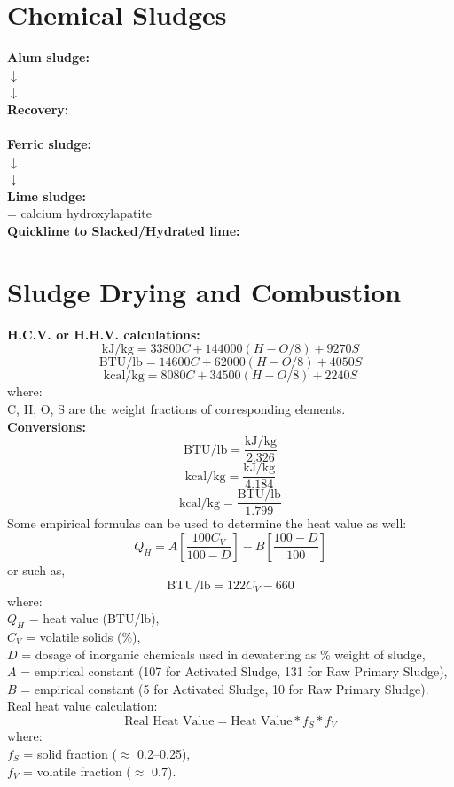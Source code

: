 \documentclass[a4paper, landscape, 8pt]{extarticle}
\begin{document}
\begin{multicols}{4}
\section*{Chemical Sludges}
\textbf{Alum sludge:}\\
 $\downarrow$\\
 $\downarrow$\\
\textbf{Recovery:}\\
\\
\textbf{Ferric sludge:}\\
 $\downarrow$\\
 $\downarrow$\\
\textbf{Lime sludge:}\\
 = calcium hydroxylapatite\\
\textbf{Quicklime to Slacked/Hydrated lime:}\\
\section*{Sludge Drying and Combustion} \label{Sludge_D_C}
\textbf{H.C.V. or H.H.V. calculations:}
\[
\text{kJ/kg} = 33800 C + 144000 (H - O/8) + 9270 S
\]
\[
\text{BTU/lb} = 14600 C + 62000 (H - O/8) + 4050 S
\]
\[
\text{kcal/kg} = 8080 C + 34500 (H - O/8) + 2240 S
\]
where:\\
C, H, O, S are the weight fractions of corresponding elements.\\
\textbf{Conversions:}
\[
\text{BTU/lb} = \frac{\text{kJ/kg}}{2.326}
\]
\[
\text{kcal/kg} = \frac{\text{kJ/kg}}{4.184}
\]
\[
\text{kcal/kg} = \frac{\text{BTU/lb}}{1.799}
\]
Some empirical formulas can be used to determine the heat value as well:
\[
Q_H = A\left[\frac{100C_V}{100-D}\right] - B\left[\frac{100-D}{100}\right]
\]
or such as,
\[
\text{BTU/lb} = 122C_V - 660
\]
where:\\
$Q_H$ = heat value (BTU/lb),\\
$C_V$ = volatile solids (\%),\\
$D$ = dosage of inorganic chemicals used in dewatering as \% weight of sludge,\\
$A$ = empirical constant (107 for Activated Sludge, 131 for Raw Primary Sludge),\\
$B$ = empirical constant (5 for Activated Sludge, 10 for Raw Primary Sludge).\\
Real heat value calculation:
\[
\text{Real Heat Value} = \text{Heat Value} * f_S * f_V
\]
where:\\
$f_S$ = solid fraction ($\approx$ 0.2--0.25),\\
$f_V$ = volatile fraction ($\approx$ 0.7).

\end{multicols}
\end{document}
